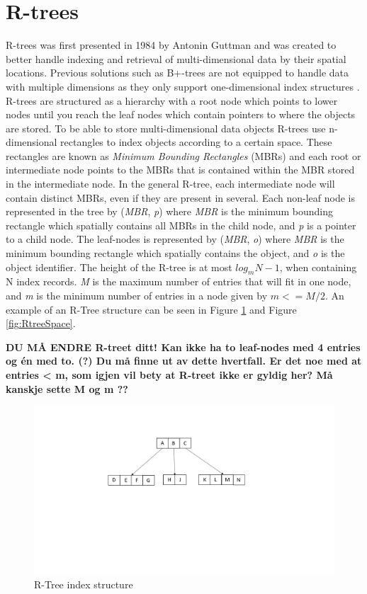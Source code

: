 \section{R-trees}
R-trees was first presented in 1984 by Antonin Guttman\cite{r-tree} and was created to better handle indexing and retrieval of multi-dimensional data by their spatial locations. Previous solutions such as B+-trees are not equipped to handle data with multiple dimensions as they only support one-dimensional index structures \cite{ComparisonOfAdvancedTree}. R-trees are structured as a hierarchy with a root node which points to lower nodes until you reach the leaf nodes which contain pointers to where the objects are stored. To be able to store multi-dimensional data objects R-trees use n-dimensional rectangles to index objects according to a certain space. These rectangles are known as \emph{Minimum Bounding Rectangles} (MBRs) and each root or intermediate node points to the MBRs that is contained within the MBR stored in the intermediate node. In the general R-tree, each intermediate node will contain distinct MBRs, even if they are present in several. Each non-leaf node is represented in the tree by (\emph{MBR},  \emph{p}) where \emph{MBR} is the minimum bounding rectangle which spatially contains all MBRs in the child node, and \emph{p} is a pointer to a child node. The leaf-nodes is represented by (\emph{MBR}, \emph{o}) where \emph{MBR} is the minimum bounding rectangle which spatially contains the object, and \emph{o} is the object identifier. The height of the R-tree is at most \(log_mN-1\), when containing N index records. \emph{M} is the maximum number of entries that will fit in one node, and \emph{m} is the minimum number of entries in a node given by \(m <= M/2\). An example of an R-Tree structure can be seen in Figure \ref{fig:RTree} and Figure \ref{fig:RtreeSpace}.

\textbf{DU MÅ ENDRE R-treet ditt! Kan ikke ha to leaf-nodes med 4 entries og én med to. (?) Du må finne ut av dette hvertfall. Er det noe med at entries < m, som igjen vil bety at R-treet ikke er gyldig her? Må kanskje sette M og m ?? }



\begin{figure}[ht]
    \centering
    \includegraphics[scale=0.4]{figures/RTree.pdf}
    \caption{R-Tree index structure}
    \label{fig:RTree}
\end{figure}

